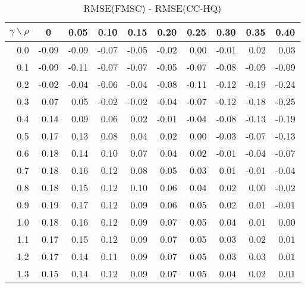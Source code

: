 \documentclass[12pt]{article}
\begin{document}
%
\begin{table}[!tbp]
\caption{RMSE(FMSC) - RMSE(CC-HQ)}
 \begin{center}
 \begin{tabular}{r|rrrrrrrrr}\hline\hline
\multicolumn{1}{c|}{$\gamma\backslash\rho$}&\multicolumn{1}{c}{0}&\multicolumn{1}{c}{0.05}&\multicolumn{1}{c}{0.10}&\multicolumn{1}{c}{0.15}&\multicolumn{1}{c}{0.20}&\multicolumn{1}{c}{0.25}&\multicolumn{1}{c}{0.30}&\multicolumn{1}{c}{0.35}&\multicolumn{1}{c}{0.40}\tabularnewline
\hline

0.0&-0.09&-0.09&-0.07&-0.05&-0.02& 0.00&-0.01& 0.02& 0.03\tabularnewline
0.1&-0.09&-0.11&-0.07&-0.07&-0.05&-0.07&-0.08&-0.09&-0.09\tabularnewline
0.2&-0.02&-0.04&-0.06&-0.04&-0.08&-0.11&-0.12&-0.19&-0.24\tabularnewline
0.3& 0.07& 0.05&-0.02&-0.02&-0.04&-0.07&-0.12&-0.18&-0.25\tabularnewline
0.4& 0.14& 0.09& 0.06& 0.02&-0.01&-0.04&-0.08&-0.13&-0.19\tabularnewline
0.5& 0.17& 0.13& 0.08& 0.04& 0.02& 0.00&-0.03&-0.07&-0.13\tabularnewline
0.6& 0.18& 0.14& 0.10& 0.07& 0.04& 0.02&-0.01&-0.04&-0.07\tabularnewline
0.7& 0.18& 0.16& 0.12& 0.08& 0.05& 0.03& 0.01&-0.01&-0.04\tabularnewline
0.8& 0.18& 0.15& 0.12& 0.10& 0.06& 0.04& 0.02& 0.00&-0.02\tabularnewline
0.9& 0.19& 0.17& 0.12& 0.09& 0.06& 0.05& 0.02& 0.01&-0.01\tabularnewline
1.0& 0.18& 0.16& 0.12& 0.09& 0.07& 0.05& 0.04& 0.01& 0.00\tabularnewline
1.1& 0.17& 0.15& 0.12& 0.09& 0.07& 0.05& 0.03& 0.02& 0.01\tabularnewline
1.2& 0.17& 0.14& 0.11& 0.09& 0.07& 0.05& 0.03& 0.03& 0.01\tabularnewline
1.3& 0.15& 0.14& 0.12& 0.09& 0.07& 0.05& 0.04& 0.02& 0.01\tabularnewline
\hline
\end{tabular}

\end{center}

\end{table}
\end{document}
